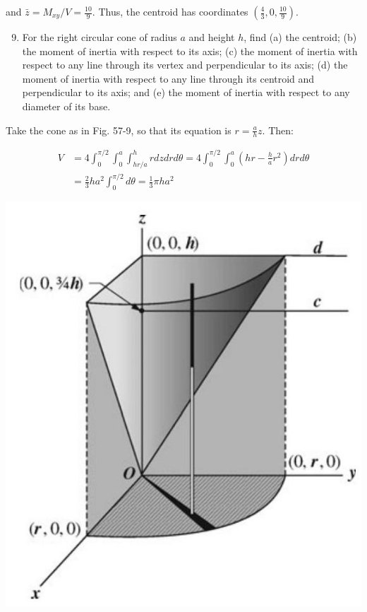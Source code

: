 \documentclass[10pt]{article}
\begin{document}
and $\bar{z}=M_{x y} / V=\frac{10}{9}$. Thus, the centroid has coordinates $\left(\frac{4}{3}, 0, \frac{10}{9}\right)$.

\begin{enumerate}
  \setcounter{enumi}{8}
  \item For the right circular cone of radius $a$ and height $h$, find (a) the centroid; (b) the moment of inertia with respect to its axis; (c) the moment of inertia with respect to any line through its vertex and perpendicular to its axis; (d) the moment of inertia with respect to any line through its centroid and perpendicular to its axis; and (e) the moment of inertia with respect to any diameter of its base.
\end{enumerate}

Take the cone as in Fig. 57-9, so that its equation is $r=\frac{a}{h} z$. Then:

$$
\begin{aligned}
V & =4 \int_{0}^{\pi / 2} \int_{0}^{a} \int_{h r / a}^{h} r d z d r d \theta=4 \int_{0}^{\pi / 2} \int_{0}^{a}\left(h r-\frac{h}{a} r^{2}\right) d r d \theta \\
& =\frac{2}{3} h a^{2} \int_{0}^{\pi / 2} d \theta=\frac{1}{3} \pi h a^{2}
\end{aligned}
$$

\begin{center}
\includegraphics[max width=\textwidth]{2024_04_20_fe2e8e718cc0fcd63d1bg-06(1)}
\end{center}
\end{document}
